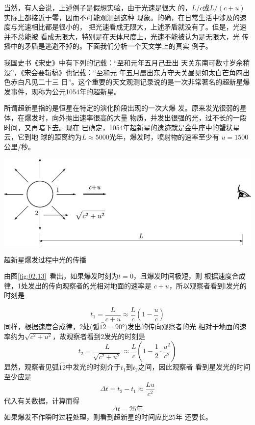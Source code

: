 当然，有人会说，上述例子是假想实验，由于光速是很大
的，$L/c$或$L/(c+u)$实际上都接近于零，因而不可能观测到这种
现象。的确，在日常生活中涉及的速度与光速相比都是很小的，
把光速看成无限大，上述矛盾就没有了。但是，光速并不总能被
看成无限大，特别是在天体尺度上，光速不能被认为是无限大，光
传播中的矛盾是逃避不掉的。下面我们分析一个天文学上的真实
例子。

我国史书《宋史》中有下列的记载：“至和元年五月己丑出
天关东南可数寸岁余稍没”，《宋会要辑稿》也记载：“至和元
年五月晨出东方守天关昼见如太白芒角四出色赤白凡见二十三
日”。这个重要的天文观测记录说的是一次非常著名的超新星爆
发事件，现称为公元1054年的超新星。

所谓超新星指的是恒星在特定的演化阶段出现的一次大爆
发。原来发光很弱的星体，在爆发时，向外抛出速率很高的大量
物质，并发出很强的光，过不长的一段时间，又再暗下去。现在
巳确定，1054年超新星的遗迹就是金牛座中的蟹状星云，它到地
球的距离约为$L \approx 5000$光年，爆发时，喷射物的速率至少有
$u=1500$公里/秒。
\begin{figurex}
    \centering
    \includegraphics{figure/fig02.13}
    \caption{超新星爆发过程中光的传播}
    \label{fig:02.13}
\end{figurex}

由图\ref{fig:02.13}~看出，如果爆发时刻为$t=0$，且爆发时间极短，则
根据速度合成律，1处发出的传向观察者的光相对地面的速率是
$c+u$，所以观察者看到l发光的时刻是

\begin{equation*}
    t_{1}=\frac{L}{c+u} \approx \frac{L}{c}\left(1-\frac{u}{c}\right)
\end{equation*}
同样，根据速度合成律，2处(弧$\overset{\frown}{12}=\ang{90;;}$)发出的传向观察者的光
相对于地面的速率约为$\sqrt{c^2 + u^2}$，故观察者看到2发光的时刻是
\begin{equation*}
    t_{2}=\frac{L}{\sqrt{c^{2}+u^{2}}} \approx \frac{L}{c}\left(1-\frac{1}{2} \cdot \frac{u^{2}}{c^{2}}\right)
\end{equation*}
显然，观察者见弧$\overset{\frown}{12}$中发光的时刻介于$t_1$到$t_2$之间，因此观察者
看到星发光的时间至少应是
\begin{equation*}
    \Delta t=t_{2}-t_{1} \approx \frac{Lu}{c^{2}}
\end{equation*}
代入有关数据，计算而得
\begin{equation*}
    \Delta t=25\text{年}
\end{equation*}
如果爆发不作瞬时过程处理，则看到超新星的时间应比25年
还要长。

